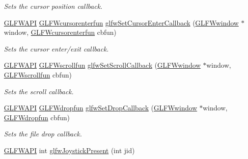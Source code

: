 \begin{DoxyCompactItemize}
\begin{DoxyCompactList}\small\item\em Sets the cursor position callback. \end{DoxyCompactList}\item 
\mbox{\hyperlink{glfw3_8h_a56da5036b2cc259351ae22fd6439bb47}{G\+L\+F\+W\+A\+PI}} \mbox{\hyperlink{group__input_ga51ab436c41eeaed6db5a0c9403b1c840}{G\+L\+F\+Wcursorenterfun}} \mbox{\hyperlink{group__input_gaa20014985561efeb2c53f1956f727830}{glfw\+Set\+Cursor\+Enter\+Callback}} (\mbox{\hyperlink{group__window_ga3c96d80d363e67d13a41b5d1821f3242}{G\+L\+F\+Wwindow}} $\ast$window, \mbox{\hyperlink{group__input_ga51ab436c41eeaed6db5a0c9403b1c840}{G\+L\+F\+Wcursorenterfun}} cbfun)
\begin{DoxyCompactList}\small\item\em Sets the cursor enter/exit callback. \end{DoxyCompactList}\item 
\mbox{\hyperlink{glfw3_8h_a56da5036b2cc259351ae22fd6439bb47}{G\+L\+F\+W\+A\+PI}} \mbox{\hyperlink{group__input_ga4687e2199c60a18a8dd1da532e6d75c9}{G\+L\+F\+Wscrollfun}} \mbox{\hyperlink{group__input_ga29011514e93368712a3063a28707ced3}{glfw\+Set\+Scroll\+Callback}} (\mbox{\hyperlink{group__window_ga3c96d80d363e67d13a41b5d1821f3242}{G\+L\+F\+Wwindow}} $\ast$window, \mbox{\hyperlink{group__input_ga4687e2199c60a18a8dd1da532e6d75c9}{G\+L\+F\+Wscrollfun}} cbfun)
\begin{DoxyCompactList}\small\item\em Sets the scroll callback. \end{DoxyCompactList}\item 
\mbox{\hyperlink{glfw3_8h_a56da5036b2cc259351ae22fd6439bb47}{G\+L\+F\+W\+A\+PI}} \mbox{\hyperlink{group__input_gab71f4ca80b651462852e601caf308c4a}{G\+L\+F\+Wdropfun}} \mbox{\hyperlink{group__input_gad4fc40df63a5d0441ab06de9a585cc04}{glfw\+Set\+Drop\+Callback}} (\mbox{\hyperlink{group__window_ga3c96d80d363e67d13a41b5d1821f3242}{G\+L\+F\+Wwindow}} $\ast$window, \mbox{\hyperlink{group__input_gab71f4ca80b651462852e601caf308c4a}{G\+L\+F\+Wdropfun}} cbfun)
\begin{DoxyCompactList}\small\item\em Sets the file drop callback. \end{DoxyCompactList}\item 
\mbox{\hyperlink{glfw3_8h_a56da5036b2cc259351ae22fd6439bb47}{G\+L\+F\+W\+A\+PI}} int \mbox{\hyperlink{group__input_gacb1b7dfd79df673d48814c06fc436eff}{glfw\+Joystick\+Present}} (int jid)

\end{DoxyCompactItemize}
